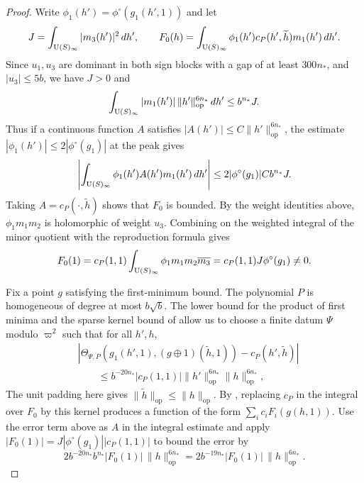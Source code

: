 \begin{proof}
Write $\phi_1(h')=\phi^\circ(g_1(h',1))$ and let
\[
 J=\int_{\operatorname{U}(S)_\infty}|m_3(h')|^2\,dh',
 \qquad
 F_0(h)=\int_{\operatorname{U}(S)_\infty}\phi_1(h')c_P(h',\widetilde h)m_1(h')\,dh'.
\]
Since $u_1,u_3$ are dominant in both sign blocks with a gap of at least $300n_*$, and $|u_3|\le 5b$, we have $J>0$ and
\[
 \int_{\operatorname{U}(S)_\infty}|m_1(h')|\,\|h'\|_{\mathrm{op}}^{6n_*}\,dh'
 \le b^{n_*}J .
\]
Thus if a continuous function $A$ satisfies $|A(h')|\le C\|h'\|_{\mathrm{op}}^{6n_*}$, the estimate $|\phi_1(h')|\le2|\phi^\circ(g_1)|$ at the peak gives
\[
 \left|\int_{\operatorname{U}(S)_\infty}\phi_1(h')A(h')m_1(h')\,dh'\right|
 \le2|\phi^\circ(g_1)|C b^{n_*}J .
\]
Taking $A=c_P(\cdot,\widetilde h)$ shows that $F_0$ is bounded. By the weight identities above, $\phi_1m_1m_2$ is holomorphic of weight $u_3$. Combining  on the weighted integral of the minor quotient with the reproduction formula gives
\[
 F_0(1)=c_P(1,1)\int_{\operatorname{U}(S)_\infty}\phi_1m_1m_2\overline{m_3}
       =c_P(1,1)J\phi^\circ(g_1)\ne0.
\]

Fix a point $g$ satisfying the first-minimum bound. The polynomial $P$ is homogeneous of degree at most $b\sqrt b$. The lower bound for the product of first minima and the sparse kernel bound of  allow us to choose a finite datum $\Psi$ modulo $\varpi^2$ such that for all $h',h$,
\[
 \begin{aligned}
 &\left|\Theta_{\Psi,P}(g_1(h',1),(g\oplus1)(\widetilde h,1))
       -c_P(h',\widetilde h)\right|\\
 &\hspace{2em}\le b^{-20n_*}|c_P(1,1)|
          \|h'\|_{\mathrm{op}}^{6n_*}\|h\|_{\mathrm{op}}^{6n_*},
 \end{aligned}
\]
The unit padding here gives $\|\widetilde h\|_{\mathrm{op}}\le \|h\|_{\mathrm{op}}$. By , replacing $c_P$ in the integral over $F_0$ by this kernel produces a function of the form $\sum_i c_iF_i(g(h,1))$. Use the error term above as $A$ in the integral estimate and apply $|F_0(1)|=J|\phi^\circ(g_1)||c_P(1,1)|$ to bound the error by
\[
 2b^{-20n_*}b^{n_*}|F_0(1)|\,\|h\|_{\mathrm{op}}^{6n_*}
 =2b^{-19n_*}|F_0(1)|\,\|h\|_{\mathrm{op}}^{6n_*}.
\]
\end{proof}

